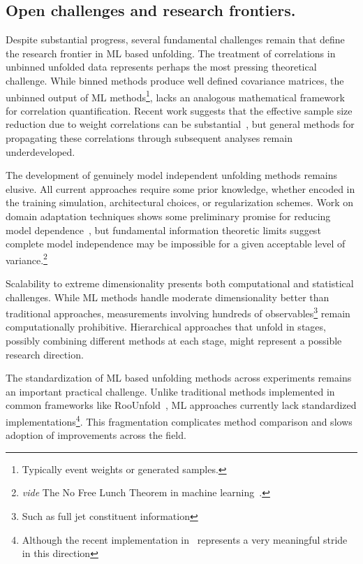     \subsection{Open challenges and research frontiers.}
        Despite substantial progress, several fundamental challenges remain that define the research frontier in ML based unfolding.
        The treatment of correlations in unbinned unfolded data represents perhaps the most pressing theoretical challenge.
        While binned methods produce well defined covariance matrices, the unbinned output of ML methods\footnote{Typically event weights or generated samples.}, lacks an analogous mathematical framework for correlation quantification.
        Recent work suggests that the effective sample size reduction due to weight correlations can be substantial~\cite{Desai:2025mpy}, but general methods for propagating these correlations through subsequent analyses remain underdeveloped.
        
        The development of genuinely model independent unfolding methods remains elusive.
        All current approaches require some prior knowledge, whether encoded in the training simulation, architectural choices, or regularization schemes.
        Work on domain adaptation techniques shows some preliminary promise for reducing model dependence~\cite{Terjek2019AdversarialRegularization}, but fundamental information theoretic limits suggest complete model independence may be impossible for a given acceptable level of variance.\footnote{\textit{vide} The {No Free Lunch Theorem} in machine learning~\cite{wolpertNoFreeLunch1997}.}
        
        Scalability to extreme dimensionality presents both computational and statistical challenges.
        While ML methods handle moderate dimensionality better than traditional approaches, measurements involving hundreds of observables\footnote{Such as full jet constituent information} remain computationally prohibitive.
        Hierarchical approaches that unfold in stages, possibly combining different methods at each stage, might represent a possible research direction.
        
        The standardization of ML based unfolding methods across experiments remains an important practical challenge.
        Unlike traditional methods implemented in common frameworks like RooUnfold~\cite{adye_unfolding_2011}, ML approaches currently lack standardized implementations\footnote{Although the recent implementation in~\cite{OmnifoldOmniFoldLibrary} represents a very meaningful stride in this direction}.
        This fragmentation complicates method comparison and slows adoption of improvements across the field.

